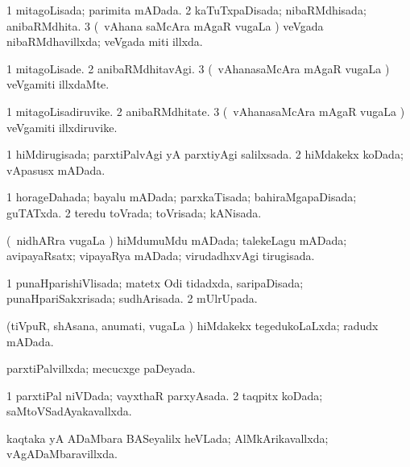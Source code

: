 {{\bentry
{} 
\gl{\gu}
\expl{}
\bmng
\bnum
\num{1} mitagoLisada; parimita mADada. 
\num{2} kaTuTxpaDisada; nibaRMdhisada; anibaRMdhita. 
\num{3} (\kanmu\ vAhana saMcAra mAgaR \mo vugaLa \vi) veVgada nibaRMdhavillxda; veVgada miti illxda. 
\enum
\emng
\eentry

\bentry
{} 
\gl{\kirxvi}
\expl{}
\bmng
\bnum
\num{1} mitagoLisade. 
\num{2} anibaRMdhitavAgi. 
\num{3} (\kanmu\ vAhanasaMcAra mAgaR \mo vugaLa \vi) veVgamiti illxdaMte. 
\enum
\emng
\eentry

\bentry
{} 
\gl{\nA}
\expl{}
\bmng
\bnum
\num{1} mitagoLisadiruvike. 
\num{2} anibaRMdhitate. 
\num{3} (\kanmu\ vAhanasaMcAra mAgaR \mo vugaLa \vi) veVgamiti illxdiruvike. 
\enum
\emng
\eentry

\bentry
{} 
\gl{\gu}
\expl{}
\bmng
\bnum
\num{1} hiMdirugisada; parxtiPalvAgi yA parxtiyAgi salilxsada. 
\num{2} hiMdakekx koDada; vApasusx mADada. 
\enum
\emng
\eentry

\bentry
{} 
\gl{\gu}
\expl{}
\bmng
\bnum
\num{1} horageDahada; bayalu mADada; parxkaTisada; bahiraMgapaDisada; guTATxda. 
\num{2} teredu toVrada; toVrisada; kANisada. 
\enum
\emng
\eentry

\bentry
{} 
\gl{\gu}
\expl{}
\bmng
(\kanmu\ nidhARra \mo vugaLa \vi) hiMdumuMdu mADada; talekeLagu mADada; avipayaRsatx; vipayaRya mADada; virudadhxvAgi tirugisada. 
\emng
\eentry

\bentry
{} 
\gl{\gu}
\expl{}
\bmng
\bnum
\num{1} punaHparishiVlisada; matetx Odi tidadxda, saripaDisada; punaHpariSakxrisada; sudhArisada. 
\num{2} mUlrUpada. 
\enum
\emng
\eentry

\bentry
{} 
\gl{\gu}
\expl{}
\bmng
(tiVpuR, shAsana, anumati, \mo vugaLa \vi) hiMdakekx tegedukoLaLxda; radudx mADada. 
\emng
\eentry

\bentry
{} 
\gl{\gu}
\expl{}
\bmng
parxtiPalvillxda; mecucxge paDeyada. 
\emng
\eentry

\bentry
{} 
 \gl{\gu} \bmng
\bnum
\num{1} parxtiPal niVDada; vayxthaR parxyAsada. 
\num{2} taqpitx koDada; saMtoVSadAyakavallxda. 
\enum
\emng
\eentry

\bentry
{} 
\gl{\gu}
\expl{}
\bmng
kaqtaka yA ADaMbara BASeyalilx heVLada; AlMkArikavallxda; vAgADaMbaravillxda. 
\emng
\eentry

}}
